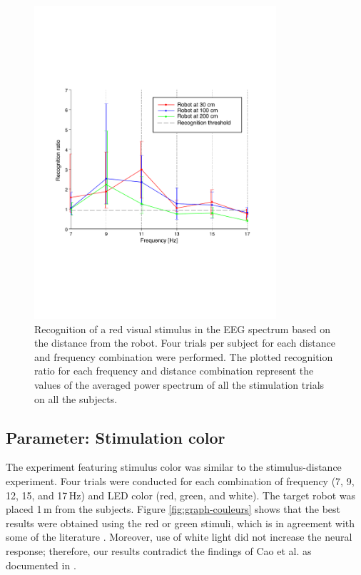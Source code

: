 \documentclass[smallextended]{svjour3}
\begin{document}
\begin{figure}
\center
\includegraphics[width=0.8\textwidth]{figures/graph-distances.pdf}
\caption{Recognition of a red visual stimulus in the EEG spectrum based on the distance from the robot. Four trials per subject for each distance and frequency combination were performed. The plotted recognition ratio for each frequency and distance combination represent the values of the averaged power spectrum of all the stimulation trials on all the subjects.}
\label{fig:graph-distances}
\end{figure}
\subsection{Parameter: Stimulation color}
The experiment featuring stimulus color was similar to the stimulus-distance experiment. 
Four trials were conducted for each combination of frequency (7, 9, 12, 15, and 17\,Hz) and LED color (red, green, and white). The target robot was placed 1\,m from the subjects. 
Figure \ref{fig:graph-couleurs} shows that the best results were obtained using the red or green stimuli, which is in agreement with some of the literature \cite{chua2004effects,duvinage2013performance,Faller2010,hvaring2014comparison}. Moreover, use of white light did not increase the neural response; therefore, our results contradict the findings of Cao et al. as documented in \cite{cao2012flashing}. 
\end{document}
